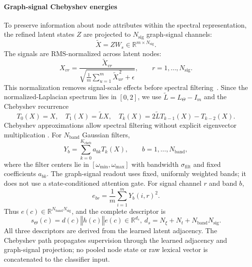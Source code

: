 \documentclass[final,5p,times,twocolumn]{elsarticle}
\newcommand{\concat}{\mathbin\Vert}
\theoremstyle{plain}
\begin{document}
\paragraph{Graph-signal Chebyshev energies}
To preserve information about node attributes within the spectral representation, the refined latent states $Z$ are projected to $N_{\mathrm{sig}}$ graph-signal channels:
\begin{equation}
\widetilde{X}
=
ZW_s
\in\mathbb{R}^{m\times N_{\mathrm{sig}}}.
\label{eq:revised_raw_graph_signal}
\end{equation}
The signals are RMS-normalized across latent nodes:
\begin{equation}
X_{vr}
=
\frac{\widetilde{X}_{vr}}
{
\sqrt{
\frac{1}{m}
\sum_{u=1}^{m}
\widetilde{X}_{ur}^{\,2}
+\epsilon
}
},
\qquad
r=1,\ldots,N_{\mathrm{sig}}.
\label{eq:revised_graph_signal}
\end{equation}
This normalization removes signal-scale effects before spectral filtering~\cite{??}. Since the normalized-Laplacian spectrum lies in $[0,2]$, we use $\widetilde{L}=L_{\Theta}-I_m$ and the Chebyshev recurrence
\begin{equation}
T_0(X)=X,\quad
T_1(X)=\widetilde{L}X,\quad
T_k(X)=2\widetilde{L}T_{k-1}(X)-T_{k-2}(X).
\end{equation}
Chebyshev approximations allow spectral filtering without explicit eigenvector multiplication \cite{defferrard2016chebnet}. For $N_{\mathrm{band}}$ Gaussian filters,
\begin{equation}
Y_b
=
\sum_{k=0}^{K_{\mathrm{cheb}}}
a_{bk}T_k(X),
\qquad
b=1,\ldots,N_{\mathrm{band}},
\label{eq:revised_chebyshev_filter}
\end{equation}
where the filter centers lie in $[\omega_{\min},\omega_{\max}]$ with bandwidth $\sigma_{\mathrm{filt}}$ and fixed coefficients $a_{bk}$. The graph-signal readout uses fixed, uniformly weighted bands; it does not use a state-conditioned attention gate. For signal channel $r$ and band $b$,
\begin{equation}
e_{br}
=
\frac{1}{m}
\sum_{i=1}^{m}
Y_b(i,r)^2.
\label{eq:revised_spectral_energy}
\end{equation}
Thus $e(c)\in\mathbb{R}^{N_{\mathrm{band}}N_{\mathrm{sig}}}$, and the complete descriptor is
\begin{equation}
s_{\Theta}(c)
=
d(c)\concat h(c)\concat e(c)
\in\mathbb{R}^{d_s},
\
d_s
=
N_{\xi}+N_t+N_{\mathrm{band}}N_{\mathrm{sig}}.
\label{eq:revised_spectral_descriptor}
\end{equation}
All three descriptors are derived from the learned latent adjacency. The Chebyshev path propagates supervision through the learned adjacency and graph-signal projection; no pooled node state or raw lexical vector is concatenated to the classifier input.
\end{document}
